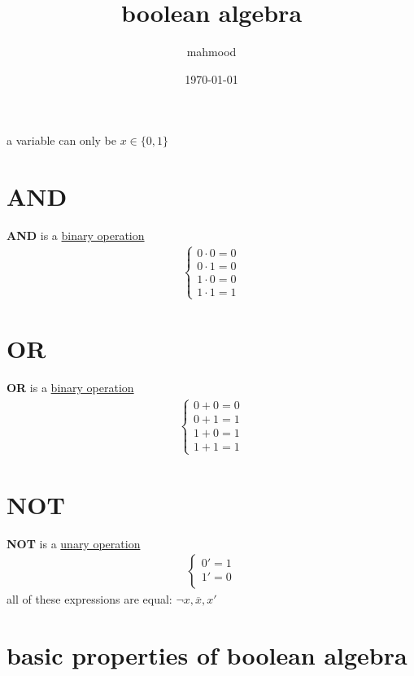 \documentclass[a4paper,12pt]{article}
\author{mahmood}
\date{\today}
\title{boolean algebra}
\begin{document}
\maketitle
\begin{definition}
a variable can only be \(x \in \{0, 1\}\)\\
\end{definition}
\section{AND}
\label{sec:org9085f40}
\textbf{AND} is a \href{20221219005229-binary_operation.org}{binary operation}\\
\begin{gather*}
  \begin{cases}
    0 \cdot 0 = 0\\
    0 \cdot 1 = 0\\
    1 \cdot 0 = 0\\
    1 \cdot 1 = 1
  \end{cases}
\end{gather*}
\section{OR}
\label{sec:orga2f57d8}
\textbf{OR} is a \href{20221219005229-binary_operation.org}{binary operation}\\
\begin{gather*}
  \begin{cases}
    0 + 0 = 0\\
    0 + 1 = 1\\
    1 + 0 = 1\\
    1 + 1 = 1
  \end{cases}
\end{gather*}
\section{NOT}
\label{sec:orgc9ff093}
\textbf{NOT} is a \href{20221219005258-unary_operation.org}{unary operation}\\
\begin{gather*}
  \begin{cases}
    0' = 1\\
    1' = 0\\
  \end{cases}
\end{gather*}
all of these expressions are equal: \(\lnot x,\overline x,x'\)\\
\section{basic properties of boolean algebra}
\label{sec:orga39f5c1}
\end{document}
